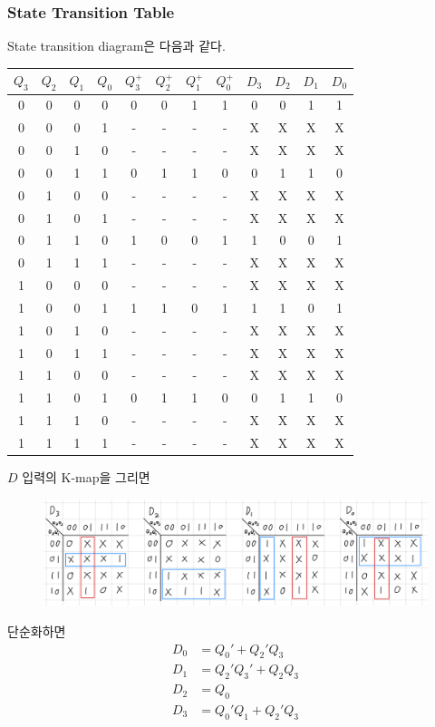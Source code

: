 \documentclass{scrartcl}
\begin{document}
\subsubsection{State Transition Table}
State transition diagram은 다음과 같다.
\begin{table}[H]
  \centering
  \begin{tabular}{cccc|cccc|cccc}
    \hline
    \(Q_3\) & \(Q_2\) & \(Q_1\) & \(Q_0\) & \(Q^+_3\) & \(Q^+_2\) & \(Q^+_1\) & \(Q^+_0\) & \(D_3\) & \(D_2\) & \(D_1\) & \(D_0\) \\
    \hline
    0 & 0 & 0 & 0 & 0 & 0 & 1 & 1 & 0 & 0 & 1 & 1 \\
    0 & 0 & 0 & 1 & - & - & - & - & X & X & X & X \\
    0 & 0 & 1 & 0 & - & - & - & - & X & X & X & X \\
    0 & 0 & 1 & 1 & 0 & 1 & 1 & 0 & 0 & 1 & 1 & 0 \\
    0 & 1 & 0 & 0 & - & - & - & - & X & X & X & X \\
    0 & 1 & 0 & 1 & - & - & - & - & X & X & X & X \\
    0 & 1 & 1 & 0 & 1 & 0 & 0 & 1 & 1 & 0 & 0 & 1 \\
    0 & 1 & 1 & 1 & - & - & - & - & X & X & X & X \\
    1 & 0 & 0 & 0 & - & - & - & - & X & X & X & X \\
    1 & 0 & 0 & 1 & 1 & 1 & 0 & 1 & 1 & 1 & 0 & 1 \\
    1 & 0 & 1 & 0 & - & - & - & - & X & X & X & X \\
    1 & 0 & 1 & 1 & - & - & - & - & X & X & X & X \\
    1 & 1 & 0 & 0 & - & - & - & - & X & X & X & X \\
    1 & 1 & 0 & 1 & 0 & 1 & 1 & 0 & 0 & 1 & 1 & 0 \\
    1 & 1 & 1 & 0 & - & - & - & - & X & X & X & X \\
    1 & 1 & 1 & 1 & - & - & - & - & X & X & X & X \\
    \hline
  \end{tabular}
\end{table}
\(D\) 입력의 K-map을 그리면
\begin{figure}[H]
  \centering
  \includegraphics[width=0.9\linewidth]{lab6_3_kmap.jpeg}
\end{figure}
단순화하면
\begin{align*}
  D_0 &= Q_0' + Q_2' Q_3 \\
  D_1 &= Q_2' Q_3' + Q_2 Q_3 \\
  D_2 &= Q_0 \\
  D_3 &= Q_0' Q_1 + Q_2' Q_3
\end{align*}
\end{document}
